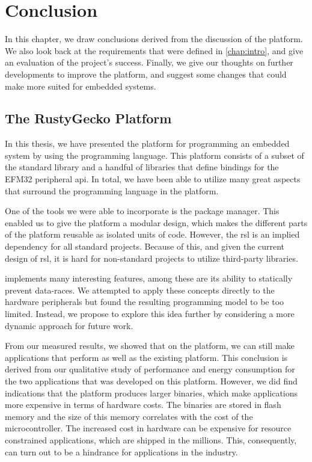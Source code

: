
\chapter{Conclusion}
\label{chap:conclusion}

In this chapter, we draw conclusions derived from the discussion of the {\rg} platform.
We also look back at the requirements that were defined in \autoref{chap:intro}, and give an evaluation of the project's success.
Finally, we give our thoughts on further developments to improve the {\rg} platform, and suggest some changes that could make {\rust} more suited for embedded systems.

\section{The RustyGecko Platform}

In this thesis, we have presented the {\rg} platform for programming an embedded system by using the {\rust} programming language.
This platform consists of a subset of the {\rust} standard library and a handful of libraries that define bindings for the EFM32 peripheral \gls{api}.
In total, we have been able to utilize many great aspects that surround the {\rust} programming language in the {\rg} platform.

One of the tools we were able to incorporate is the {\cargo} package manager.
This enabled us to give the {\rg} platform a modular design, which makes the different parts of the platform reusable as isolated units of code.
However, the \gls{rsl} is an implied dependency for all standard {\rust} projects.
Because of this, and given the current design of \gls{rsl}, it is hard for non-standard projects to utilize third-party libraries.

{\rust} implements many interesting features, among these are its ability to statically prevent data-races.
We attempted to apply these concepts directly to the hardware peripherals but found the resulting programming model to be too limited.
Instead, we propose to explore this idea further by considering a more dynamic approach for future work.

From our measured results, we showed that on the {\rg} platform, we can still make applications that perform as well as the existing {\C} platform.
This conclusion is derived from our qualitative study of performance and energy consumption for the two applications that was developed on this platform.
However, we did find indications that the platform produces larger binaries, which make {\rust} applications more expensive in terms of hardware costs.
The binaries are stored in flash memory and the size of this memory correlates with the cost of the microcontroller.
The increased cost in hardware can be expensive for resource constrained applications, which are shipped in the millions.
This, consequently, can turn out to be a hindrance for applications in the industry.

